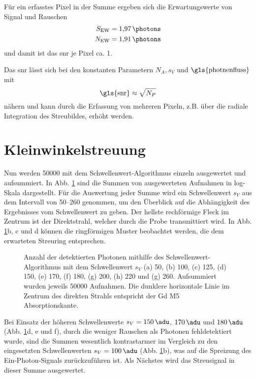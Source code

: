 \noindent
Für ein erfasstes Pixel in der Summe ergeben sich die Erwartungswerte von Signal und Rauschen \begin{equation}
    \begin{split}
        S_\text{EW} &= \SI{1.97}{\photons}\\
        N_\text{EW} &= \SI{1.91}{\photons}\\
    \end{split}
\end{equation}
und damit ist das \gls{snr} je Pixel ca. 1.

\noindent
Das \gls{snr} lässt sich bei den konstanten Parametern $N_A, s_V$ und $\text{\gls{photnenfluss}}$ mit
\begin{equation}
    \text{\gls{snr}} \approx \sqrt{N_P}
    \label{eq:snr_pixel}
\end{equation}
nähern und kann durch die Erfassung von mehreren Pixeln, z.B. über die radiale Integration des Streubildes, erhöht werden.

\section{Kleinwinkelstreuung}
Nun werden \SI{50000}{\captures} mit dem Schwellenwert-Algorithmus einzeln ausgewertet und aufsummiert. In Abb. \ref{fig:th_50_100_125_150_170_180_200_220_260} sind die Summen von ausgewerteten Aufnahmen in log-Skala dargestellt. Für die Auswertung jeder Summe wird ein Schwellenwert $s_V$ aus dem Intervall von \SIrange{50}{260}{\adu} genommen, um den Überblick auf die Abhängigkeit des Ergebnisses vom Schwellenwert zu geben. Der hellste rechförmige Fleck im Zentrum ist der Direktstrahl, welcher durch die Probe transmittiert wird. In Abb. \ref{fig:th_50_100_125_150_170_180_200_220_260}b, c und d können die ringförmigen Muster beobachtet werden, die dem erwarteten Streuring entsprechen.
\begin{figure}[H]
    \centering
    
    \caption{Anzahl der detektierten Photonen mithilfe des Schwellenwert-Algorithmus mit dem Schwellenwert $s_V$ (a) \SI{50}{\adu}, (b) \SI{100}{\adu}, (c) \SI{125}{\adu}, (d) \SI{150}{\adu}, (e) \SI{170}{\adu}, (f) \SI{180}{\adu}, (g) \SI{200}{\adu}, (h) \SI{220}{\adu} und (g) \SI{260}{\adu}. Aufsummiert wurden jeweils \num{50000} Aufnahmen. Die dunklere horizontale Linie im Zentrum des direkten Strahls entspricht der Gd M5 Absorptionskante.}
    \label{fig:th_50_100_125_150_170_180_200_220_260}
\end{figure}
\noindent
Bei Einsatz der höheren Schwellenwerte $s_V = \SI{150}{\adu}$, $\SI{170}{\adu}$ und $\SI{180}{\adu}$ (Abb. \ref{fig:th_50_100_125_150_170_180_200_220_260}d, e und f), durch die weniger Rauschen als Photonen fehldetektiert wurde, sind die Summen wesentlich kontrastarmer im Vergleich zu den eingesetzten Schwellenwerten $s_V = \SI{100}{\adu}$ (Abb. \ref{fig:th_50_100_125_150_170_180_200_220_260}b), was auf die Spreizung des Ein-Photon-Signals zurückzuführen ist. Als Nächstes wird das Streusignal in dieser Summe ausgewertet. 

